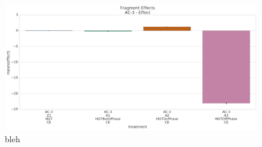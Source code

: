\documentclass[PhD]{msu-thesis}
\begin{document}
\begin{figure}[h!]
\begin{center}
\includegraphics[width=0.7\columnwidth]{figures/HGT/fitness_effect_by_cycle_phase_source.png}
\caption{bleh%
}\label{fig:fitness_effect_by_cycle_phase_source}
\end{center}
\end{figure}

\end{document}
